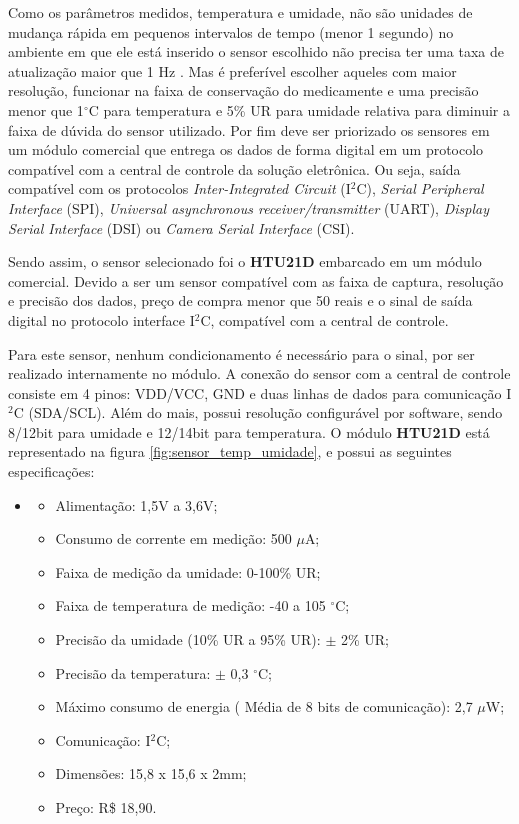     Como os parâmetros medidos, temperatura e umidade, não são unidades de mudança rápida em pequenos intervalos de tempo (menor 1 segundo) no ambiente em que ele está inserido o sensor escolhido não precisa ter uma taxa de atualização maior que 1 Hz \cite{webster2018measurement}. Mas é preferível escolher aqueles com maior resolução, funcionar na faixa de conservação do medicamente e uma precisão menor que 1$^\circ$C para temperatura e 5\% UR para umidade relativa para diminuir a faixa de dúvida do sensor utilizado. Por fim deve ser priorizado os sensores em um módulo comercial que entrega os dados de forma digital em um protocolo compatível com a central de controle da solução eletrônica. Ou seja, saída compatível com os protocolos \textit{Inter-Integrated Circuit} (I$^2$C), \textit{Serial Peripheral Interface} (SPI), \textit{Universal asynchronous receiver/transmitter} (UART), \textit{Display Serial Interface} (DSI) ou \textit{Camera Serial Interface} (CSI).
    
    Sendo assim, o sensor selecionado foi o \textbf{HTU21D} embarcado em um módulo comercial. Devido a ser um sensor compatível com as faixa de captura, resolução e precisão dos dados, preço de compra menor que 50 reais e o sinal de saída digital no protocolo interface I$^2$C, compatível com a central de controle.
    
    Para este sensor, nenhum condicionamento é necessário para o sinal, por ser realizado internamente no módulo. A conexão do sensor com a central de controle consiste em 4 pinos: VDD/VCC, GND e duas linhas de dados para comunicação I$^2$C (SDA/SCL). Além do mais, possui resolução configurável por software, sendo 8/12bit para umidade e 12/14bit para temperatura. O módulo \textbf{HTU21D} está representado na figura \ref{fig:sensor_temp_umidade}, e possui as seguintes especificações:

    \begin{itemize}
    \item[ ]
        \begin{itemize}
            \item Alimentação: 1,5V a 3,6V;
            \item Consumo de corrente em medição: 500 $\mu$A;
            \item Faixa de medição da umidade: 0-100\% UR;
            \item Faixa de temperatura de medição: -40 a 105 $^\circ$C;
            \item Precisão da umidade (10\% UR a 95\% UR):  $\pm$ 2\% UR;
            \item Precisão da temperatura: $\pm$ 0,3 $^\circ$C;
            \item Máximo consumo de energia ( Média de 8 bits de comunicação): 2,7 $\mu$W;
            \item Comunicação: I$^2$C;
            \item Dimensões: 15,8 x 15,6 x 2mm;
            \item Preço: R\$ 18,90.
        \end{itemize}
    \end{itemize}
    
